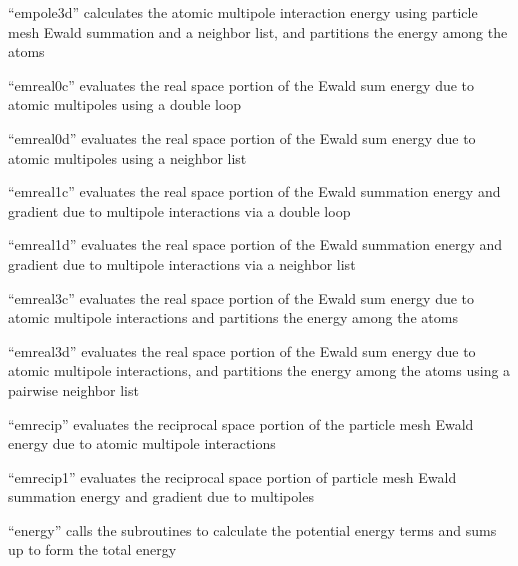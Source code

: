 \documentclass[letterpaper,11pt,english]{sphinxmanual}
\begin{document}

“empole3d” calculates the atomic multipole interaction energy
using particle mesh Ewald summation and a neighbor list, and
partitions the energy among the atoms


“emreal0c” evaluates the real space portion of the Ewald sum
energy due to atomic multipoles using a double loop


“emreal0d” evaluates the real space portion of the Ewald sum
energy due to atomic multipoles using a neighbor list


“emreal1c” evaluates the real space portion of the Ewald
summation energy and gradient due to multipole interactions
via a double loop


“emreal1d” evaluates the real space portion of the Ewald
summation energy and gradient due to multipole interactions
via a neighbor list


“emreal3c” evaluates the real space portion of the Ewald sum
energy due to atomic multipole interactions and partitions
the energy among the atoms


“emreal3d” evaluates the real space portion of the Ewald sum
energy due to atomic multipole interactions, and partitions
the energy among the atoms using a pairwise neighbor list


“emrecip” evaluates the reciprocal space portion of the particle
mesh Ewald energy due to atomic multipole interactions


“emrecip1” evaluates the reciprocal space portion of particle
mesh Ewald summation energy and gradient due to multipoles


“energy” calls the subroutines to calculate the potential
energy terms and sums up to form the total energy

\end{document}
